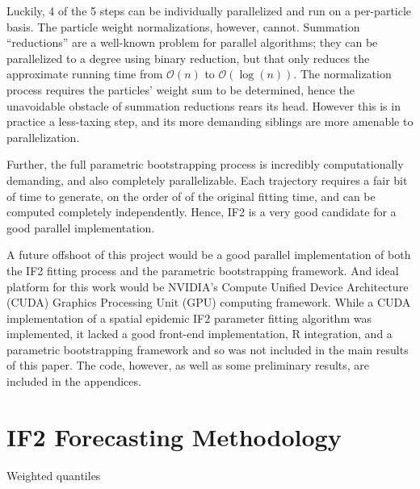 	Luckily, 4 of the 5 steps can be individually parallelized and run on a per-particle basis. The particle weight normalizations, however, cannot. Summation ``reductions'' are a well-known problem for parallel algorithms; they can be parallelized to a degree using binary reduction, but that only reduces the approximate running time from $\mathcal{O}(n)$ to $\mathcal{O}(\log(n))$. The normalization process requires the particles' weight sum to be determined, hence the unavoidable obstacle of summation reductions rears its head. However this is in practice a less-taxing step, and its more demanding siblings are more amenable to parallelization.

	Further, the full parametric bootstrapping process is incredibly computationally demanding, and also completely parallelizable. Each trajectory requires a fair bit of time to generate, on the order of of the original fitting time, and can be computed completely independently. Hence, IF2 is a very good candidate for a good parallel implementation.

	A future offshoot of this project would be a good parallel implementation of both the IF2 fitting process and the parametric bootstrapping framework. And ideal platform for this work would be NVIDIA's Compute Unified Device Architecture (CUDA) Graphics Processing Unit (GPU) computing framework. While a CUDA implementation of a spatial epidemic IF2 parameter fitting algorithm was implemented, it lacked a good front-end implementation, R integration, and a parametric bootstrapping framework and so was not included in the main results of this paper. The code, however, as well as some preliminary results, are included in the appendices.




\section{IF2 Forecasting Methodology}

	Weighted quantiles

	\lipsum[7-8]